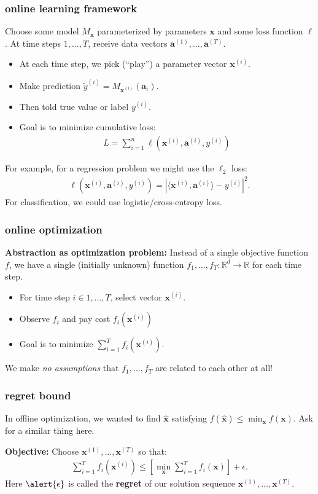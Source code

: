 \documentclass[compress]{beamer}
\newcommand{\bv}[1]{\mathbf{#1}}
\newcommand{\R}{\mathbb{R}}
\begin{document}
\begin{frame}
	\frametitle{online learning framework}
	Choose some model $M_\bv{x}$ parameterized by parameters $\bv{x}$ and some loss function $\ell$. 
	At time steps $1,\ldots, T$, receive data vectors $\bv{a}^{(1)}, \ldots, \bv{a}^{(T)}$. 
	\begin{itemize}
		\item At each time step, we pick (``play'') a parameter vector $\bv{x}^{(i)}$.
		\item Make prediction $\tilde{y}^{(i)} = M_{\bv{x}^{(i)}}(\bv{a}_i)$.
		\item Then told true value or label $y^{(i)}$. 
		\item Goal is to minimize cumulative loss:
		\begin{align*}
			L = \sum_{i=1}^n \ell(\bv{x}^{(i)}, \bv{a}^{(i)}, y^{(i)})
		\end{align*} 
	\end{itemize}
	For example, for a regression problem we might use the $\ell_2$ loss:
	\begin{align*}
		\ell(\bv{x}^{(i)}, \bv{a}^{(i)}, y^{(i)}) = \left|\langle\bv{x}^{(i)},\bv{a}^{(i)}\rangle - y^{(i)}\right|^2. 
	\end{align*}
For classification, we could use logistic/cross-entropy loss. 
\end{frame}

\begin{frame}
	\frametitle{online optimization}
	\textbf{Abstraction as optimization problem:} Instead of a single objective function $f$, we have a single (initially unknown) function $f_1, \ldots, f_T: \R^d \rightarrow \R$ for each time step. 
	\begin{itemize}
		\item For time step $i\in 1,\ldots, T$, select vector $\bv{x}^{(i)}$.
		\item Observe $f_i$ and pay cost $f_i(\bv{x}^{(i)})$
		\item Goal is to minimize $\sum_{i=1}^T f_i(\bv{x}^{(i)})$. 
	\end{itemize}

	\begin{center}
		We make \emph{no assumptions} that $f_1, \ldots, f_T$ are related to each other at all!
	\end{center}
\end{frame}

\begin{frame}[t]
	\frametitle{regret bound}
	In offline optimization, we wanted to find $\hat{\bv{x}}$ satisfying $f(\hat{\bv{x}}) \leq \min_{\bv{x}} f(\bv{x})$. Ask for a similar thing here. 
	
	\textbf{Objective:} Choose $\bv{x}^{(1)}, \ldots, \bv{x}^{(T)}$ so that: 
	\begin{align*}
		\sum_{i=1}^T f_i(\bv{x}^{(i)}) \leq \left[\min_\bv{x} \sum_{i=1}^T f_i(\bv{x})\right] + \epsilon.
	\end{align*}
	Here $\alert{\epsilon}$ is called the \alert{\textbf{regret}} of our solution sequence $\bv{x}^{(1)}, \ldots, \bv{x}^{(T)}$.

\end{frame}
\end{document}
